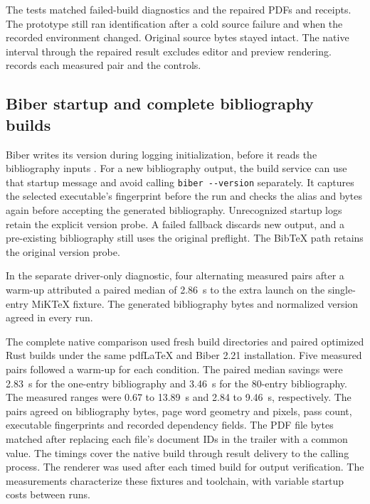 The tests matched failed-build diagnostics and the repaired PDFs and
receipts. The prototype still ran identification after a cold source
failure and when the recorded environment changed. Original source
bytes stayed intact. The native interval through the repaired result
excludes editor and preview rendering.
records each measured pair and the controls.


\subsection{Biber startup and complete bibliography builds}

Biber writes its version during logging initialization, before it reads
the bibliography inputs \cite{biberstartup219,biberstartup221}. For a
new bibliography output, the build service can use that startup message
and avoid calling \texttt{biber -{}-version} separately. It captures the
selected executable's fingerprint before the run and checks the alias
and bytes again before accepting the generated bibliography. Unrecognized
startup logs retain the explicit version probe. A failed fallback discards
new output, and a pre-existing bibliography still uses the original
preflight. The BibTeX path retains the original version probe.

In the separate driver-only diagnostic, four alternating measured pairs
after a warm-up attributed a paired median of 2.86~s to the extra launch
on the single-entry MiKTeX fixture. The generated bibliography bytes
and normalized version agreed in every run.

The complete native comparison used fresh build directories and paired
optimized Rust builds under the same pdf\LaTeX{} and Biber 2.21
installation. Five measured pairs followed a warm-up for each condition.
The paired median savings were 2.83~s for the one-entry bibliography
and 3.46~s for the 80-entry bibliography. The measured ranges were
0.67 to 13.89~s and 2.84 to 9.46~s, respectively.
The pairs agreed on bibliography bytes, page word geometry and pixels,
pass count, executable fingerprints and recorded dependency fields.
The PDF file bytes matched after replacing each file's document IDs
in the trailer with a common value.
The timings cover the native build through result delivery to the
calling process. The renderer was used after each timed build for
output verification. The measurements characterize these fixtures and
toolchain, with variable startup costs between runs.

